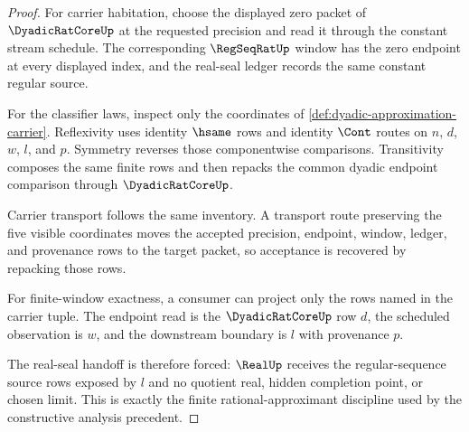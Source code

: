 \begin{proof}
For carrier habitation, choose the displayed zero packet of $\DyadicRatCoreUp$ at the requested precision and read it through the constant stream schedule. The corresponding $\RegSeqRatUp$ window has the zero endpoint at every displayed index, and the real-seal ledger records the same constant regular source.

For the classifier laws, inspect only the coordinates of \autoref{def:dyadic-approximation-carrier}. Reflexivity uses identity $\hsame$ rows and identity $\Cont$ routes on $n$, $d$, $w$, $l$, and $p$. Symmetry reverses those componentwise comparisons. Transitivity composes the same finite rows and then repacks the common dyadic endpoint comparison through $\DyadicRatCoreUp$.

Carrier transport follows the same inventory. A transport route preserving the five visible coordinates moves the accepted precision, endpoint, window, ledger, and provenance rows to the target packet, so acceptance is recovered by repacking those rows.

For finite-window exactness, a consumer can project only the rows named in the carrier tuple. The endpoint read is the $\DyadicRatCoreUp$ row $d$, the scheduled observation is $w$, and the downstream boundary is $l$ with provenance $p$.

The real-seal handoff is therefore forced: $\RealUp$ receives the regular-sequence source rows exposed by $l$ and no quotient real, hidden completion point, or chosen limit. This is exactly the finite rational-approximant discipline used by the constructive analysis precedent.
\end{proof}

